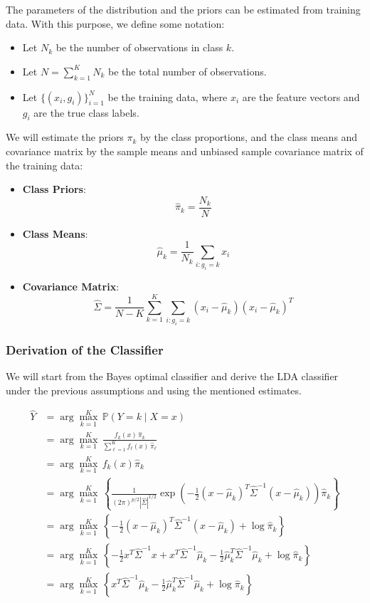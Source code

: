 \documentclass[a4paper,12pt]{article}
\begin{document}
The parameters of the distribution and the priors can be estimated from training data. With this purpose, we define some notation:

\begin{itemize}
    \item Let $N_k$ be the number of observations in class $k$.
    \item Let $N = \sum_{k=1}^K N_k$ be the total number of observations.
    \item Let $\{(x_i, g_i)\}_{i=1}^N$ be the training data, where $x_i$ are the feature vectors and $g_i$ are the true class labels.
\end{itemize}

We will estimate the priors $\pi_k$ by the class proportions, and the class means and covariance matrix by the sample means and unbiased sample covariance matrix of the training data:

\begin{itemize}
    \item \textbf{Class Priors}:
    \[
    \hat{\pi}_k = \frac{N_k}{N}
    \]
    \item \textbf{Class Means}:
    \[
    \hat{\mu}_k = \frac{1}{N_k} \sum_{i: g_i = k} x_i
    \]
    \item \textbf{Covariance Matrix}:
    \[
    \hat{\Sigma} = \frac{1}{N - K} \sum_{k=1}^K \sum_{i: g_i = k} (x_i - \hat{\mu}_k)(x_i - \hat{\mu}_k)^T \label{eq:sample-covariance}
    \]
\end{itemize}

\subsubsection{Derivation of the Classifier}

We will start from the Bayes optimal classifier and derive the LDA classifier under the previous assumptions and using the mentioned estimates.

\begin{align*}
\hat{Y} &= \arg\max_{k=1}^K \, \mathbb{P}(Y = k \mid X = x) \\
&= \arg\max_{k=1}^K \, \frac{f_k(x) \, \hat{\pi}_k}{\sum_{\ell=1}^K f_\ell(x) \, \hat{\pi}_\ell} \\
&= \arg\max_{k=1}^K \, f_k(x) \hat{\pi}_k \\
&= \arg\max_{k=1}^K \, \left\{\frac{1}{(2\pi)^{p/2} |\hat{\Sigma}|^{1/2}} \exp\left(-\frac{1}{2}(x - \hat{\mu}_k)^T \hat{\Sigma}^{-1} (x - \hat{\mu}_k)\right) \hat{\pi}_k\right\} \\
&= \arg\max_{k=1}^K \, \left\{-\frac{1}{2}(x - \hat{\mu}_k)^T \hat{\Sigma}^{-1} (x - \hat{\mu}_k) + \log \hat{\pi}_k\right\} \\
&= \arg\max_{k=1}^K \, \left\{-\frac{1}{2}x^T \hat{\Sigma}^{-1} x + x^T \hat{\Sigma}^{-1} \hat{\mu}_k - \frac{1}{2}\hat{\mu}_k^T \hat{\Sigma}^{-1} \hat{\mu}_k + \log \hat{\pi}_k\right\} \\
&= \arg\max_{k=1}^K \, \left\{x^T \hat{\Sigma}^{-1} \hat{\mu}_k - \frac{1}{2}\hat{\mu}_k^T \hat{\Sigma}^{-1} \hat{\mu}_k + \log \hat{\pi}_k\right\}
\end{align*}
\end{document}
